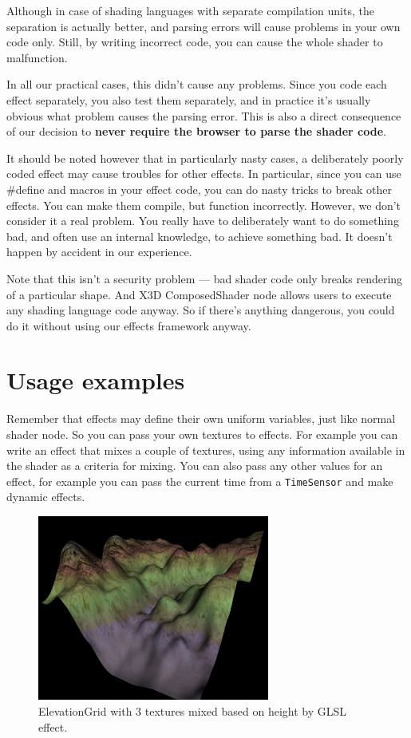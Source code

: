 \documentclass{acmsiggraph}                     %
\begin{document}
Although in case of shading languages with separate compilation units,
the separation is actually better, and parsing errors will cause
problems in your own code only. Still, by writing incorrect code,
you can cause the whole shader to malfunction.

In all our practical cases, this didn't cause any problems.
Since you code each effect separately, you also test them separately,
and in practice it's usually obvious what problem causes the parsing error.
This is also a direct consequence of our decision to \textbf{never require
the browser to parse the shader code}.

It should be noted however that in particularly nasty cases,
a deliberately poorly coded effect may cause troubles for other effects.
In particular, since you can use \#define and macros in your effect code,
you can do nasty tricks to break other effects. You can make them compile,
but function incorrectly. However, we don't consider
it a real problem. You really have to deliberately want to do something bad,
and often use an internal knowledge, to achieve something bad.
It doesn't happen by accident in our experience.

Note that this isn't a security problem --- bad shader code only breaks
rendering of a particular shape. And X3D ComposedShader node allows users
to execute any shading language code anyway. So if there's anything dangerous,
you could do it without using our effects framework anyway.

\section{Usage examples}

Remember that effects may define their own uniform variables,
just like normal shader node. So you can pass your own textures
to effects. For example you can write an effect that mixes a couple of textures,
using any information available in the shader as a criteria for mixing.
You can also pass any other values for an effect, for example you can
pass the current time from a \texttt{TimeSensor} and make dynamic effects.

\begin{figure}[H]
  \centering
  \includegraphics[width=3in]{terrain}
  \caption{ElevationGrid with 3 textures mixed based on height by GLSL effect.}
\end{figure}
\end{document}
